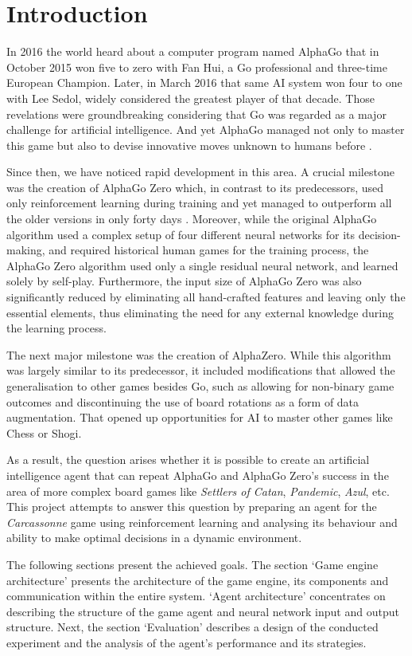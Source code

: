 \section{Introduction}
\label{chap:introduction}

In 2016 the world heard about a computer program named AlphaGo that in October 2015
won five to zero with Fan Hui, a Go professional and three-time European Champion. Later,
in March 2016 that same AI system won four to one with Lee Sedol, widely considered the
greatest player of that decade. Those revelations were groundbreaking considering that Go
was regarded as a major challenge for artificial intelligence. And yet AlphaGo managed not
only to master this game but also to devise innovative moves unknown to humans before \cite{AlphaGoBlog}.

Since then, we have noticed rapid development in this area. A crucial milestone was
the creation of AlphaGo Zero which, in contrast to its predecessors, used only reinforcement
learning during training and yet managed to outperform all the older versions in only forty
days \cite{AlphaGoZeroBlog}. Moreover, while the original AlphaGo algorithm used a complex setup
of four different neural networks for its decision-making, and required historical human games
for the training process, the AlphaGo Zero algorithm used only a single residual neural network,
and learned solely by self-play. Furthermore, the input size of AlphaGo Zero was also significantly
reduced by eliminating all hand-crafted features and leaving only the essential elements,
thus eliminating the need for any external knowledge during the learning process.

The next major milestone was the creation of AlphaZero. While this algorithm was largely similar
to its predecessor, it included modifications that allowed the generalisation to other games besides Go,
such as allowing for non-binary game outcomes and discontinuing the use of board rotations as a form of
data augmentation. That opened up opportunities for AI to master other games like Chess or Shogi.

As a result, the question arises whether it is possible to create an artificial intelligence
agent that can repeat AlphaGo and AlphaGo Zero's success in the area of more complex
board games like \textit{Settlers of Catan}, \textit{Pandemic}, \textit{Azul}, etc. This 
project attempts to answer this question by preparing an agent for the \textit{Carcassonne} game 
using reinforcement learning and analysing its behaviour and ability to make optimal 
decisions in a dynamic environment.

The following sections present the achieved goals. The section `Game engine architecture' 
presents the architecture of the game engine, its components and communication within the entire system. `Agent architecture' 
concentrates on describing the structure of the game agent and neural network input and
output structure. Next, the section `Evaluation' describes a design of the conducted experiment 
and the analysis of the agent's performance and its strategies.
